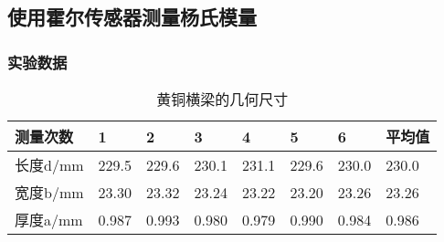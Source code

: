 \documentclass[UTF-8,twoside,cs4size]{ctexart}
\begin{document}
\subsection{使用霍尔传感器测量杨氏模量}
\subsubsection{实验数据}
\begin{table}[!h]
    \centering
    \caption{黄铜横梁的几何尺寸}
    \begin{tabular}{|l|l|l|l|l|l|l|l|}
    \hline
        测量次数 & 1 & 2 & 3 & 4 & 5 & 6 & 平均值 \\ \hline
        长度d/mm & 229.5 & 229.6 & 230.1 & 231.1 & 229.6 & 230.0 &230.0 \\ \hline
        宽度b/mm & 23.30 & 23.32 & 23.24 & 23.22 & 23.20 & 23.26 &23.26  \\ \hline
        厚度a/mm & 0.987 & 0.993 & 0.980 & 0.979 & 0.990 & 0.984 & 0.986 \\ \hline
    \end{tabular}
\end{table}
\end{document}

